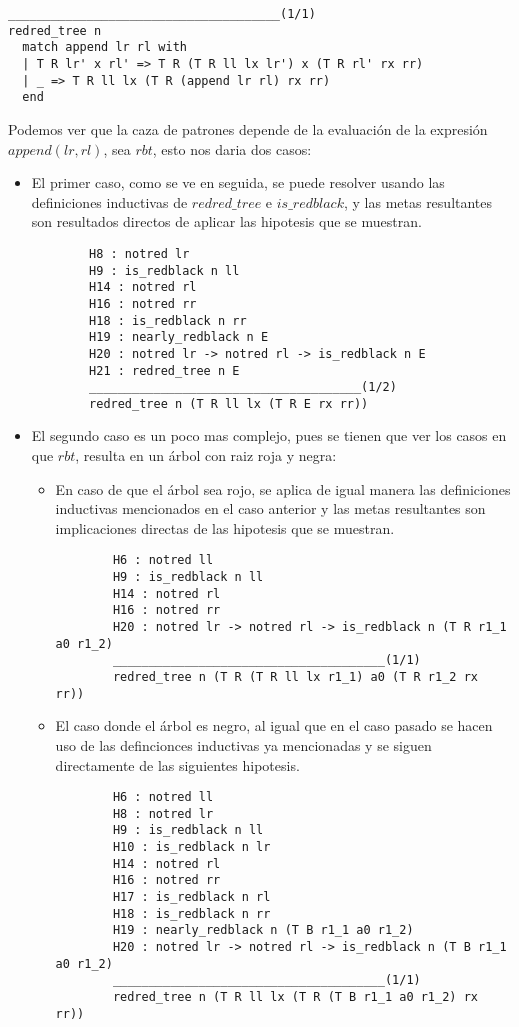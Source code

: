 \begin{verbatim}
______________________________________(1/1)
redred_tree n
  match append lr rl with
  | T R lr' x rl' => T R (T R ll lx lr') x (T R rl' rx rr)
  | _ => T R ll lx (T R (append lr rl) rx rr)
  end
\end{verbatim}

Podemos ver que la caza de patrones depende de la evaluaci\'on de la expresi\'on $append(lr,rl)$,
sea $rbt$, esto nos daria dos casos:

\begin{itemize}
    \item El primer caso, como se ve en seguida, se puede resolver usando las definiciones
    inductivas de $redred\_tree$ e $is\_redblack$, y las metas resultantes son resultados directos
    de aplicar las hipotesis que se muestran.
    \begin{verbatim}
        H8 : notred lr
        H9 : is_redblack n ll
        H14 : notred rl
        H16 : notred rr
        H18 : is_redblack n rr
        H19 : nearly_redblack n E
        H20 : notred lr -> notred rl -> is_redblack n E
        H21 : redred_tree n E
        ______________________________________(1/2)
        redred_tree n (T R ll lx (T R E rx rr))
    \end{verbatim}
    \item El segundo caso es un poco mas complejo, pues se tienen que ver los casos en que $rbt$,
    resulta en un \'arbol con raiz roja y negra:
    \begin{itemize}
        \item En caso de que el \'arbol sea rojo, se aplica de igual manera las definiciones
        inductivas mencionados en el caso anterior y las metas resultantes son implicaciones
        directas de las hipotesis que se muestran.
        \begin{verbatim}
        H6 : notred ll
        H9 : is_redblack n ll
        H14 : notred rl
        H16 : notred rr
        H20 : notred lr -> notred rl -> is_redblack n (T R r1_1 a0 r1_2)
        ______________________________________(1/1)
        redred_tree n (T R (T R ll lx r1_1) a0 (T R r1_2 rx rr))
        \end{verbatim}
        \item El caso donde el \'arbol es negro, al igual que en el caso pasado se hacen uso de
        las defincionces inductivas ya mencionadas y se siguen directamente de las siguientes
        hipotesis.
        \begin{verbatim}
        H6 : notred ll
        H8 : notred lr
        H9 : is_redblack n ll
        H10 : is_redblack n lr
        H14 : notred rl
        H16 : notred rr
        H17 : is_redblack n rl
        H18 : is_redblack n rr
        H19 : nearly_redblack n (T B r1_1 a0 r1_2)
        H20 : notred lr -> notred rl -> is_redblack n (T B r1_1 a0 r1_2)
        ______________________________________(1/1)
        redred_tree n (T R ll lx (T R (T B r1_1 a0 r1_2) rx rr))
        \end{verbatim}
    \end{itemize}
\end{itemize}

